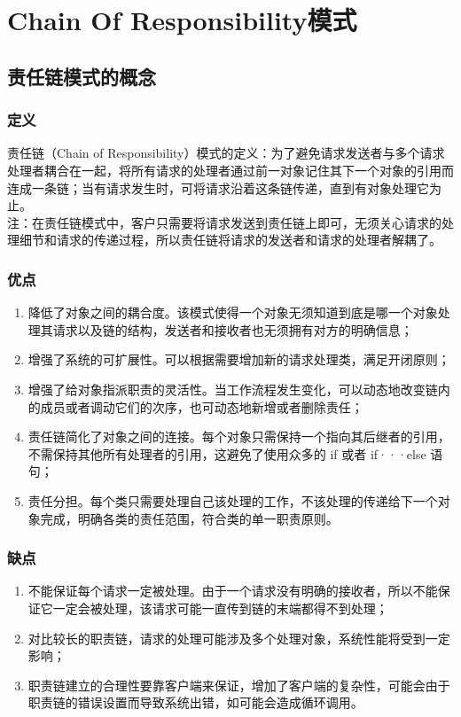 \chapter{Chain Of Responsibility模式}
\section{责任链模式的概念}
\subsection{定义}
责任链（Chain of Responsibility）模式的定义：为了避免请求发送者与多个请求处理者耦合在一起，将所有请求的处理者通过前一对象记住其下一个对象的引用而连成一条链；当有请求发生时，可将请求沿着这条链传递，直到有对象处理它为止。
\\ 注：在责任链模式中，客户只需要将请求发送到责任链上即可，无须关心请求的处理细节和请求的传递过程，所以责任链将请求的发送者和请求的处理者解耦了。
\subsection{优点}
\begin{enumerate}
	\item 降低了对象之间的耦合度。该模式使得一个对象无须知道到底是哪一个对象处理其请求以及链的结构，发送者和接收者也无须拥有对方的明确信息；
	\item 增强了系统的可扩展性。可以根据需要增加新的请求处理类，满足开闭原则；
	\item 增强了给对象指派职责的灵活性。当工作流程发生变化，可以动态地改变链内的成员或者调动它们的次序，也可动态地新增或者删除责任；
	\item 责任链简化了对象之间的连接。每个对象只需保持一个指向其后继者的引用，不需保持其他所有处理者的引用，这避免了使用众多的 if 或者 if···else 语句；
	\item 责任分担。每个类只需要处理自己该处理的工作，不该处理的传递给下一个对象完成，明确各类的责任范围，符合类的单一职责原则。
\end{enumerate}
\subsection{缺点}
\begin{enumerate}
	\item 不能保证每个请求一定被处理。由于一个请求没有明确的接收者，所以不能保证它一定会被处理，该请求可能一直传到链的末端都得不到处理；
	\item 对比较长的职责链，请求的处理可能涉及多个处理对象，系统性能将受到一定影响；
	\item 职责链建立的合理性要靠客户端来保证，增加了客户端的复杂性，可能会由于职责链的错误设置而导致系统出错，如可能会造成循环调用。
\end{enumerate}
